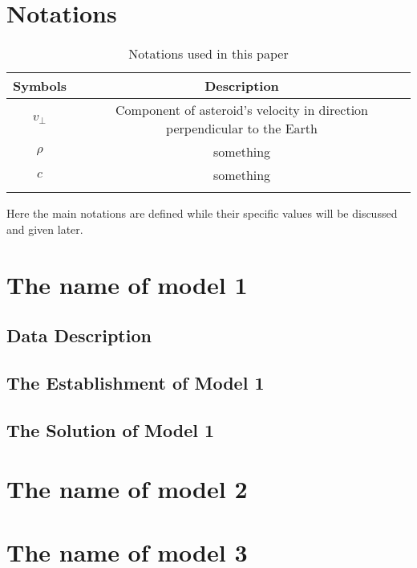\documentclass[12pt]{article}
\begin{document}
\section{Notations}
\begin{table}[h!] %
    \caption{Notations used in this paper}
    \begin{tabularx}{\textwidth}{cc}
    \toprule
    \textbf{Symbols} & \textbf{Description}\\
    \midrule
      $v_{\perp}$ & Component of asteroid's velocity in direction perpendicular to the Earth \\
      $\rho$ & something \\
      $c$ & something \\
    \bottomrule
    \label{Notation Table}
    \end{tabularx}
\end{table}
    
Here the main notations are defined while their specific values will be discussed and given later.


\section{\textbf{The name of model 1}}
\subsection{\textbf{Data Description}}

\subsection{\textbf{The Establishment of Model 1}}

\subsection{\textbf{The Solution of Model 1}}

\section{\textbf{The name of model 2}}

\section{\textbf{The name of model 3}}
\end{document}
